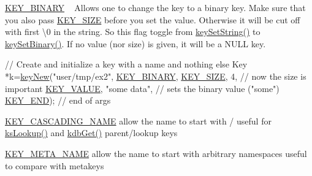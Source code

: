 \begin{DoxyItemize}
\item \hyperlink{group__key_gga9b703ca49f48b482def322b77d3e6bc8a1ca18d4e094ae7487d35ecedda2235ff}{K\+E\+Y\+\_\+\+B\+I\+N\+A\+RY} ~\newline
 Allows one to change the key to a binary key. Make sure that you also pass \hyperlink{group__key_gga9b703ca49f48b482def322b77d3e6bc8a6d531b5c41445d19d0452eebdccbfa01}{K\+E\+Y\+\_\+\+S\+I\+ZE} before you set the value. Otherwise it will be cut off with first \textbackslash{}0 in the string. So this flag toggle from \hyperlink{group__keyvalue_ga622bde1eb0e0c4994728331326340ef2}{key\+Set\+String()} to \hyperlink{group__keyvalue_gaa50a5358fd328d373a45f395fa1b99e7}{key\+Set\+Binary()}. If no value (nor size) is given, it will be a N\+U\+LL key. 
\begin{DoxyCodeInclude}
\textcolor{comment}{// Create and initialize a key with a name and nothing else}
Key *k=\hyperlink{group__key_gad23c65b44bf48d773759e1f9a4d43b89}{keyNew}(\textcolor{stringliteral}{"user/tmp/ex2"},
        \hyperlink{group__key_gga9b703ca49f48b482def322b77d3e6bc8a1ca18d4e094ae7487d35ecedda2235ff}{KEY\_BINARY},
        \hyperlink{group__key_gga9b703ca49f48b482def322b77d3e6bc8a6d531b5c41445d19d0452eebdccbfa01}{KEY\_SIZE}, 4,               \textcolor{comment}{// now the size is important}
        \hyperlink{group__key_gga9b703ca49f48b482def322b77d3e6bc8ac66e4a49d09212b79f5754ca6db5bd2e}{KEY\_VALUE}, \textcolor{stringliteral}{"some data"},    \textcolor{comment}{// sets the binary value ("some")}
        \hyperlink{group__key_gga9b703ca49f48b482def322b77d3e6bc8aa8adb6fcb92dec58fb19410eacfdd403}{KEY\_END});                  \textcolor{comment}{// end of args}
\end{DoxyCodeInclude}

\item \hyperlink{group__key_gga9b703ca49f48b482def322b77d3e6bc8afc1567f74444ff9c219f7456b652b4ec}{K\+E\+Y\+\_\+\+C\+A\+S\+C\+A\+D\+I\+N\+G\+\_\+\+N\+A\+ME} allow the name to start with / useful for \hyperlink{group__keyset_ga60f1ddcf23272f2b29b90e92ebe9b56f}{ks\+Lookup()} and \hyperlink{group__kdb_ga28e385fd9cb7ccfe0b2f1ed2f62453a1}{kdb\+Get()} parent/lookup keys
\item \hyperlink{group__key_gga9b703ca49f48b482def322b77d3e6bc8a5205cbd2831bc881da3589a95c08e054}{K\+E\+Y\+\_\+\+M\+E\+T\+A\+\_\+\+N\+A\+ME} allow the name to start with arbitrary namespaces useful to compare with metakeys
\end{DoxyItemize}

